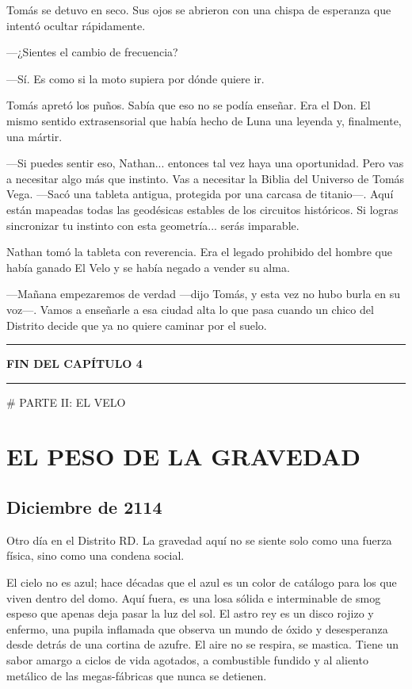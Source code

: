 \documentclass[12pt,a4paper]{book}
\begin{document}
Tomás se detuvo en seco. Sus ojos se abrieron con una chispa de esperanza que intentó ocultar rápidamente.

---¿Sientes el cambio de frecuencia?

---Sí. Es como si la moto supiera por dónde quiere ir.

Tomás apretó los puños. Sabía que eso no se podía enseñar. Era el Don. El mismo sentido extrasensorial que había hecho de Luna una leyenda y, finalmente, una mártir.

---Si puedes sentir eso, Nathan... entonces tal vez haya una oportunidad. Pero vas a necesitar algo más que instinto. Vas a necesitar la Biblia del Universo de Tomás Vega. ---Sacó una tableta antigua, protegida por una carcasa de titanio---. Aquí están mapeadas todas las geodésicas estables de los circuitos históricos. Si logras sincronizar tu instinto con esta geometría... serás imparable.

Nathan tomó la tableta con reverencia. Era el legado prohibido del hombre que había ganado El Velo y se había negado a vender su alma.

---Mañana empezaremos de verdad ---dijo Tomás, y esta vez no hubo burla en su voz---. Vamos a enseñarle a esa ciudad alta lo que pasa cuando un chico del Distrito decide que ya no quiere caminar por el suelo.

\bigskip
\noindent\rule{\textwidth}{0.4pt}
\bigskip

\textbf{FIN DEL CAPÍTULO 4}


\bigskip
\noindent\rule{\textwidth}{0.4pt}
\bigskip


# PARTE II: EL VELO

\chapter{EL PESO DE LA GRAVEDAD}

\section*{Diciembre de 2114}

Otro día en el Distrito RD. La gravedad aquí no se siente solo como una fuerza física, sino como una condena social.

El cielo no es azul; hace décadas que el azul es un color de catálogo para los que viven dentro del domo. Aquí fuera, es una losa sólida e interminable de smog espeso que apenas deja pasar la luz del sol. El astro rey es un disco rojizo y enfermo, una pupila inflamada que observa un mundo de óxido y desesperanza desde detrás de una cortina de azufre. El aire no se respira, se mastica. Tiene un sabor amargo a ciclos de vida agotados, a combustible fundido y al aliento metálico de las megas-fábricas que nunca se detienen.
\end{document}
